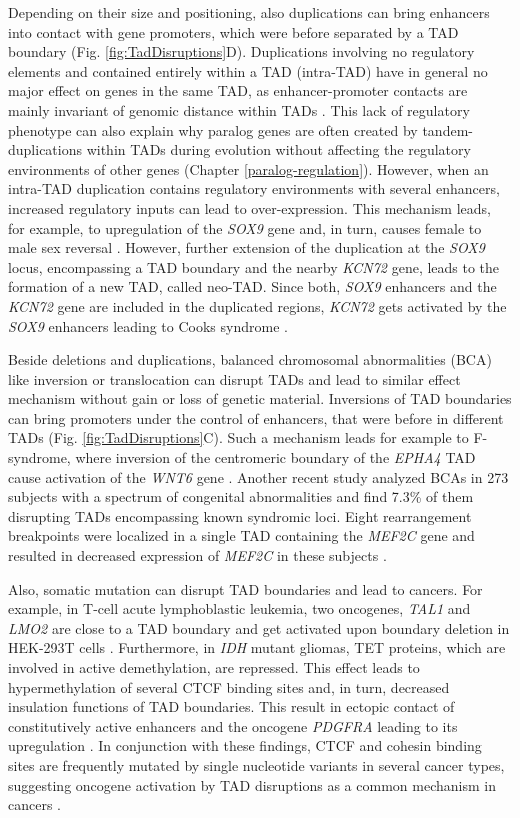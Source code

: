\documentclass[a4paper,twoside=true,openright,parskip=full,chapterprefix=true,11pt,headings=normal,bibliography=totoc,listof=totoc,titlepage=on,captions=tableabove,draft=false]{scrreprt}
\theoremstyle{definition}
\theoremstyle{definition}
\theoremstyle{definition}
\theoremstyle{remark}
\begin{document}
Depending on their size and positioning, also duplications can bring
enhancers into contact with gene promoters, which were before separated
by a TAD boundary (Fig. \ref{fig:TadDisruptions}D). Duplications
involving no regulatory elements and contained entirely within a TAD
(intra-TAD) have in general no major effect on genes in the same TAD, as
enhancer-promoter contacts are mainly invariant of genomic distance
within TADs \citep{Symmons2016}. This lack of regulatory phenotype can
also explain why paralog genes are often created by tandem-duplications
within TADs during evolution without affecting the regulatory
environments of other genes (Chapter \ref{paralog-regulation}). However,
when an intra-TAD duplication contains regulatory environments with
several enhancers, increased regulatory inputs can lead to
over-expression. This mechanism leads, for example, to upregulation of
the \emph{SOX9} gene and, in turn, causes female to male sex reversal
\citep{Franke2016}. However, further extension of the duplication at the
\emph{SOX9} locus, encompassing a TAD boundary and the nearby
\emph{KCN72} gene, leads to the formation of a new TAD, called neo-TAD.
Since both, \emph{SOX9} enhancers and the \emph{KCN72} gene are included
in the duplicated regions, \emph{KCN72} gets activated by the
\emph{SOX9} enhancers leading to Cooks syndrome \citep{Franke2016}.

Beside deletions and duplications, balanced chromosomal abnormalities
(BCA) like inversion or translocation can disrupt TADs and lead to
similar effect mechanism without gain or loss of genetic material.
Inversions of TAD boundaries can bring promoters under the control of
enhancers, that were before in different TADs (Fig.
\ref{fig:TadDisruptions}C). Such a mechanism leads for example to
F-syndrome, where inversion of the centromeric boundary of the
\emph{EPHA4} TAD cause activation of the \emph{WNT6} gene
\citep{Lupianez2015}. Another recent study analyzed BCAs in 273 subjects
with a spectrum of congenital abnormalities and find 7.3\% of them
disrupting TADs encompassing known syndromic loci. Eight rearrangement
breakpoints were localized in a single TAD containing the \emph{MEF2C}
gene and resulted in decreased expression of \emph{MEF2C} in these
subjects \citep{Redin2017}.

Also, somatic mutation can disrupt TAD boundaries and lead to cancers.
For example, in T-cell acute lymphoblastic leukemia, two oncogenes,
\emph{TAL1} and \emph{LMO2} are close to a TAD boundary and get
activated upon boundary deletion in HEK-293T cells \citep{Hnisz2016}.
Furthermore, in \emph{IDH} mutant gliomas, TET proteins, which are
involved in active demethylation, are repressed. This effect leads to
hypermethylation of several CTCF binding sites and, in turn, decreased
insulation functions of TAD boundaries. This result in ectopic contact
of constitutively active enhancers and the oncogene \emph{PDGFRA}
leading to its upregulation \citep{Flavahan2016}. In conjunction with
these findings, CTCF and cohesin binding sites are frequently mutated by
single nucleotide variants in several cancer types, suggesting oncogene
activation by TAD disruptions as a common mechanism in cancers
\citep{Katainen2015, Yu2017}.
\end{document}

